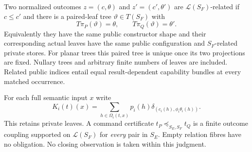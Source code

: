 \documentclass[11pt,a4paper]{article}
\theoremstyle{definition}
\begin{document}
Two normalized outcomes $z=(c,\theta)$ and $z'=(c',\theta')$ are
$\mathcal L(S_F)$-related if $c\le c'$ and there is a paired-leaf tree
$\vartheta\in T(S_F)$ with
\begin{equation}\label{eq:tree-lifting}
 T\pi_P(\vartheta)=\theta,\qquad T\pi_Q(\vartheta)=\theta'.
\end{equation}
Equivalently they have the same public constructor shape and their
corresponding actual leaves have the same public configuration and
$S_F$-related private stores. For planar trees this paired tree is unique
once its two projections are fixed. Nullary trees and arbitrary finite
numbers of leaves are included. Related public indices entail equal
result-dependent capability bundles at every matched occurrence.

For each full semantic input $x$ write
\[
 K_i(t)(x)=\sum_{h\in\Omega_i(t,x)}p_i(h)
                 \delta_{(c_i(h),\phi_i\theta_i(h))}.
\]
This retains private leaves. A command certificate
$t_P\preceq_{S_E,S_F}t_Q$ is a finite outcome coupling supported on
$\mathcal L(S_F)$ for \emph{every} pair in $S_E$. Empty relation fibres
have no obligation. No closing observation is taken within this judgment.
\end{document}
